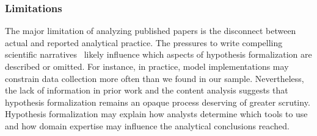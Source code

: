 \begin{comment}
Although researchers discussed the structure of their analyses, we found that
they did Although researchers more explicitly justified the structure of their
models, they did not justify why the particular model was the best one or better
than others they may have considered. There may be some trade-off analysis
researchers calculated but did not write in the paper, which is a limitation of
the literature survey that we hoped to address in the lab study. R


Sometimes, researchers implicitly communicated why their model fit their design
by discussing the two in tandem. For instance, no explicit rationale but
basically translated into procedure for CHI Sq. test. 

PNAS\_6 - page 19204 statistical consideraitons 

Related to: Sample info - Statistical Analysis? 



Other times, researchers were more explicit in how their statistical models took
(i) the study design or (ii) latent structures in the data. For instance, <find
PS example>. Find JFE example for structures. 

\end{comment}


\subsubsection{Limitations}
The major limitation of analyzing published papers is the disconnect between
actual and reported analytical practice. The pressures to write compelling
scientific narratives~\cite{kerr1998harking} likely influence which aspects of
hypothesis formalization are described or omitted. For instance, in practice, model
implementations may constrain data collection more often than we found in our
sample. Nevertheless, the lack of information in prior work and the content
analysis suggests that hypothesis formalization remains an opaque process
deserving of greater scrutiny. Hypothesis formalization may explain how analysts
determine which tools to use and how domain expertise may influence the analytical conclusions reached. 

